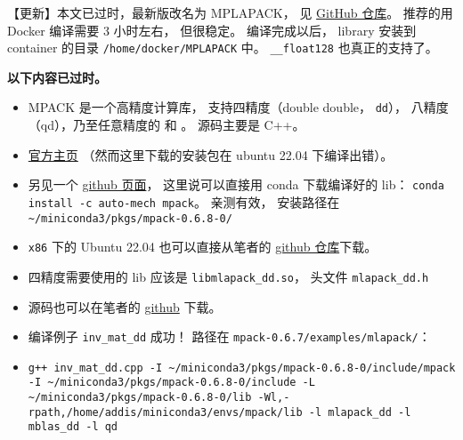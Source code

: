 
\begin{issues}
\issueDraft
\end{issues}

【更新】本文已过时，最新版改名为 MPLAPACK， 见 \href{https://github.com/nakatamaho/mplapack}{GitHub 仓库}。 推荐的用 Docker 编译需要 3 小时左右， 但很稳定。 编译完成以后， library 安装到 container 的目录 \verb`/home/docker/MPLAPACK` 中。 \verb`__float128` 也真正的支持了。

\textbf{以下内容已过时。}

\begin{itemize}
\item MPACK 是一个高精度计算库， 支持四精度（double double， \verb`dd`）， 八精度（qd），乃至任意精度的  和 。 源码主要是 C++。
\item \href{https://mplapack.sourceforge.net/}{官方主页} （然而这里下载的安装包在 ubuntu 22.04 下编译出错）。
\item 另见一个 \href{https://github.com/Auto-Mech/MPACK}{github 页面}， 这里说可以直接用 conda 下载编译好的 lib： \verb`conda install -c auto-mech mpack`。 亲测有效， 安装路径在 \verb`~/miniconda3/pkgs/mpack-0.6.8-0/`
\item \verb`x86` 下的 Ubuntu 22.04 也可以直接从笔者的 \href{https://github.com/MacroUniverse/MPACK-source}{github 仓库}下载。
\item 四精度需要使用的 lib 应该是 \verb`libmlapack_dd.so`， 头文件 \verb`mlapack_dd.h`
\item 源码也可以在笔者的 \href{https://github.com/MacroUniverse/MPACK-source}{github} 下载。
\item 编译例子 \verb`inv_mat_dd` 成功！ 路径在 \verb`mpack-0.6.7/examples/mlapack/`：
\item \verb`g++ inv_mat_dd.cpp -I ~/miniconda3/pkgs/mpack-0.6.8-0/include/mpack -I ~/miniconda3/pkgs/mpack-0.6.8-0/include -L ~/miniconda3/pkgs/mpack-0.6.8-0/lib -Wl,-rpath,/home/addis/miniconda3/envs/mpack/lib -l mlapack_dd -l mblas_dd -l qd`
\end{itemize}

